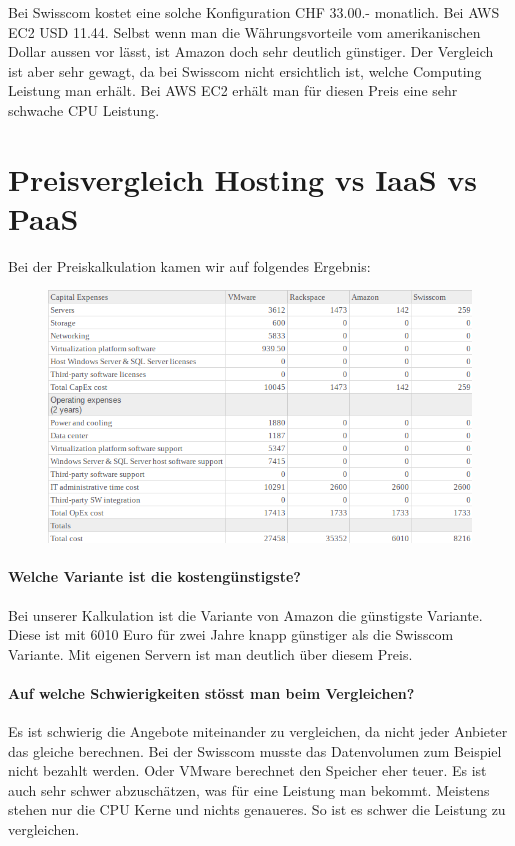 Bei Swisscom kostet eine solche Konfiguration CHF 33.00.- monatlich. Bei AWS EC2 USD 11.44. Selbst wenn man die Währungsvorteile vom amerikanischen Dollar aussen vor lässt, ist Amazon doch sehr deutlich günstiger. Der Vergleich ist aber sehr gewagt, da bei Swisscom nicht ersichtlich ist, welche Computing Leistung man erhält. Bei AWS EC2 erhält man für diesen Preis eine sehr schwache CPU Leistung.

\chapter{Preisvergleich Hosting vs IaaS vs PaaS}
Bei der Preiskalkulation kamen wir auf folgendes Ergebnis:
\begin{figure}[H]
\centering
\includegraphics[scale=0.65]{images/kostenvergleich.png}  
\end{figure}
\subsubsection{Welche Variante ist die kostengünstigste?}
Bei unserer Kalkulation ist die Variante von Amazon die günstigste Variante. Diese ist mit 6010 Euro für zwei Jahre knapp günstiger als die Swisscom Variante. Mit eigenen Servern ist man deutlich über diesem Preis.
\subsubsection{Auf welche Schwierigkeiten stösst man beim Vergleichen?}
Es ist schwierig die Angebote miteinander zu vergleichen, da nicht jeder Anbieter das gleiche berechnen. Bei der Swisscom musste das Datenvolumen zum Beispiel nicht bezahlt werden. Oder VMware berechnet den Speicher eher teuer.
Es ist auch sehr schwer abzuschätzen, was für eine Leistung man bekommt. Meistens stehen nur die CPU Kerne und nichts genaueres. So ist es schwer die Leistung zu vergleichen.

